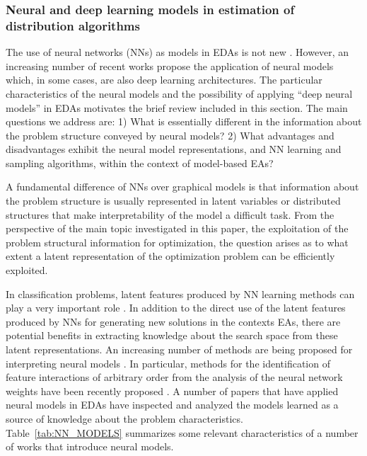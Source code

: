 \documentclass{article} %
\begin{document}
\subsubsection{Neural and deep learning models in estimation of distribution algorithms}

 The use of neural networks (NNs) as models in EDAs is not new \cite{Marti_et_al:2008,Shim_and_Tan:2012,Tang_et_al:2010,Zhang_and_Shin:2000}. However, an increasing  number of recent works \cite{Baluja:2017,Churchill_et_al:2016,Probst_and_Rothlauf:2015,Probst_et_al:2017,Saikia_et_al:2016}  propose the application of neural  models which, in some cases, are also deep learning architectures.  The particular characteristics of the neural models and the possibility of applying ``deep neural models'' in EDAs motivates the brief review included in this section. The main questions we address are: 1) What is essentially different in the information about the problem structure conveyed by neural models? 2) What advantages and disadvantages exhibit the neural model representations, and NN learning and sampling algorithms, within the context of model-based EAs?

  A fundamental difference of NNs over graphical models is that information about the problem structure is usually represented in latent variables or distributed structures that make interpretability of the model a difficult task. From the perspective of the main topic investigated in this paper, the exploitation of the problem structural information for optimization, the question arises as to what extent a latent representation of the optimization problem can be efficiently exploited. 

 In  classification problems, latent features produced by NN learning methods can play a very important role \cite{Ciresan_et_al:2011}.  In addition to the direct use of the latent features produced by NNs for generating new solutions in the contexts EAs,  there are potential benefits in extracting knowledge about the search space from these latent representations.  An increasing number of methods are being proposed for interpreting neural models \cite{Montavon_et_al:2017}. In particular, methods for the identification of feature interactions of arbitrary order from the analysis of the neural network weights have been recently proposed \cite{Tsang_et_al:2017}. A number of papers that have applied neural models in EDAs have inspected and analyzed the models learned as a source of knowledge about the problem characteristics. Table~\ref{tab:NN_MODELS} summarizes some relevant characteristics of a number of works that introduce neural models.
\end{document}
